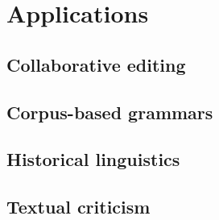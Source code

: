 \chapter{Applications} %
\label{cha:applications}

\section{Collaborative editing} %
\label{sec:collaborativeediting}


\section{Corpus-based grammars} %
\label{sec:corpusbasedgrammars}


\section{Historical linguistics} %
\label{sec:histlinguistics}



\section{Textual criticism} %
\label{sec:textualcriticism}




